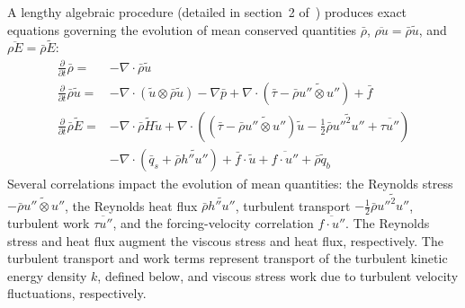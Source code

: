 \documentclass[letterpaper,11pt,nointlimits,reqno]{amsart}
\begin{document}
A lengthy algebraic procedure (detailed in section~2
of~\cite{OliverFANSModels2011}) produces exact equations governing the
evolution of mean conserved quantities $\bar{\rho}$, $\overline{\rho{}u}=
\bar{\rho}\tilde{u}$, and $\overline{\rho{}E} = \bar{\rho}\tilde{E}$:
\begin{subequations}\label{eq:unclosedfansequations}
\begin{align}
    \frac{\partial}{\partial{}t}\bar{\rho}
 =
 &- \nabla\cdot\bar{\rho}\tilde{u}
\\
    \frac{\partial{}}{\partial{}t}\bar{\rho}\tilde{u}
 =
 &- \nabla\cdot(\tilde{u}\otimes\bar{\rho}\tilde{u})
  - \nabla{}\bar{p}
  + \nabla\cdot\left(
        \bar{\tau}
      - \bar{\rho}\widetilde{u''\otimes{}u''}
    \right)
  + \bar{f}
\\
  \frac{\partial}{\partial{}t} \bar{\rho}\tilde{E}
 =
 &- \nabla\cdot{}\bar{\rho}\tilde{H}\tilde{u}
  + \nabla\cdot\left(
        \left(
            \bar{\tau}
          - \bar{\rho} \widetilde{u''\otimes{}u''}
        \right) \tilde{u}
      - \frac{1}{2}\bar{\rho}\widetilde{{u''}^{2}u''}
      + \overline{\tau{}u''}
    \right)
\\
 &- \nabla\cdot\left(
        \bar{q}_s
      + \bar{\rho} \widetilde{h''u''}
    \right)
  + \bar{f}\cdot\tilde{u}
  + \overline{f\cdot{}u''}
  + \bar{\rho}\tilde{q}_b
\end{align}
\end{subequations}
Several correlations impact the evolution of mean quantities: the Reynolds
stress $-\bar{\rho}\widetilde{u''\otimes{}u''}$, the Reynolds heat flux
$\bar{\rho} \widetilde{h''u''}$, turbulent transport
$-\frac{1}{2}\bar{\rho}\widetilde{{u''}^{2}u''}$, turbulent work
$\overline{\tau{}u''}$, and the forcing-velocity correlation
$\overline{f\cdot{}u''}$.  The Reynolds stress and heat flux augment the
viscous stress and heat flux, respectively.  The turbulent transport and work
terms represent transport of the turbulent kinetic energy density $k$, defined
below, and viscous stress work due to turbulent velocity fluctuations,
respectively.
\end{document}
